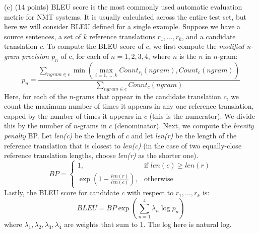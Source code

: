 \documentclass{article}
\begin{document}
\noindent
(c) (14 points)  BLEU score is the most commonly used automatic evaluation metric for NMT systems. It is usually calculated across the entire test set, but here we will consider BLEU defined for a single example. Suppose we have a source sentences, a set of $k$ reference translations $r_1,...,r_k$, and a candidate translation $c$. To compute the BLEU score of $c$, we first compute the \textit{modified n-gram precision $p_n$} of c, for each of $n = 1,2,3,4$, where $n$ is the $n$ in $n$-gram:
\smallbreak
$$p_n = \frac{\sum_{ngram\in{c}}^{} \min(\max_{i=1,...,k} Count_{r_i}(ngram), Count_c(ngram))}{\sum_{ngram\in{c}}Count_c(ngram)}$$
\smallbreak
Here, for each of the n-grams that appear in the candidate translation $c$, we count the maximum number of times it appears in any one reference translation, capped by the number of times it appears in $c$ (this is the numerator).  We divide this by the number of $n$-grams in $c$ (denominator).
\smallbreak
Next, we compute the \textit{brevity  penalty} BP. Let \textit{len(c)} be the length of $c$ and let \textit{len(r)} be the length of the reference translation that is closest to \textit{len(c)} (in the case of two equally-close reference translation lengths, choose \textit{len(r)} as the shorter one).
\smallbreak
\[
    BP= 
\begin{cases}
    1, & \text{if } len(c) \geq len(r)\\
    \exp{(1 - \frac{len(r)}{len(c)})}, & \text{otherwise}
\end{cases}
\]
\smallbreak
Lastly, the BLEU score for candidate $c$ with respect to $r_1,...,r_k$ is:
$$BLEU = BP \exp(\sum_{n=1}^{4} \lambda_n\log p_n)$$
where $\lambda_1, \lambda_2, \lambda_3, \lambda_4$ are weights that sum to 1.  The log here is natural log.
\end{document}
